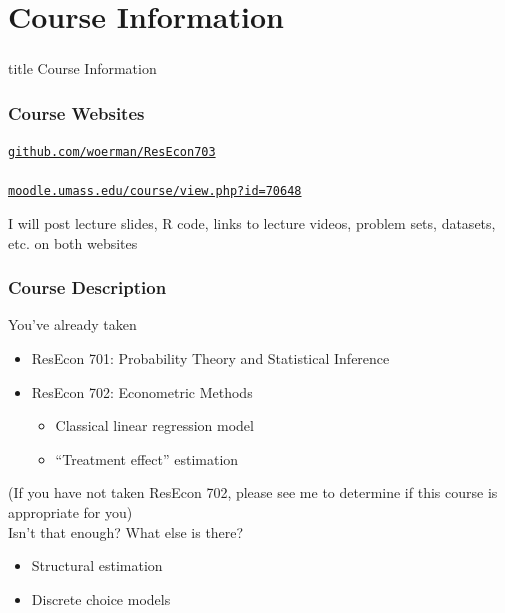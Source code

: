\documentclass{beamer}
\begin{document}
\section{Course Information}
\label{information}
\begin{frame}\frametitle{}
    \vfill
    \centering
    \begin{beamercolorbox}[center]{title}
        \Large Course Information
    \end{beamercolorbox}
    \vfill
\end{frame}

\begin{frame}\frametitle{Course Websites}
    \begin{center}
    	\href{https://github.com/woerman/ResEcon703}{\texttt{github.com/woerman/ResEcon703}} \\~\\
    	\href{https://moodle.umass.edu/course/view.php?id=70648}{\texttt{moodle.umass.edu/course/view.php?id=70648}}
    \end{center}
    \vspace{3ex}
    I will post lecture slides, R code, links to lecture videos, problem sets, datasets, etc. on both websites
\end{frame}

\begin{frame}\frametitle{Course Description}
    You've already taken
    \begin{itemize}
        \item ResEcon 701: Probability Theory and Statistical Inference
        \item ResEcon 702: Econometric Methods
        \begin{itemize}
            \item Classical linear regression model
            \item ``Treatment effect'' estimation
        \end{itemize}
    \end{itemize}
    (If you have not taken ResEcon 702, please see me to determine if this course is appropriate for you) \\
    \vspace{3ex}
    Isn't that enough? What else is there?
    \begin{itemize}
        \item Structural estimation
        \item Discrete choice models
    \end{itemize}
\end{frame}
\end{document}
